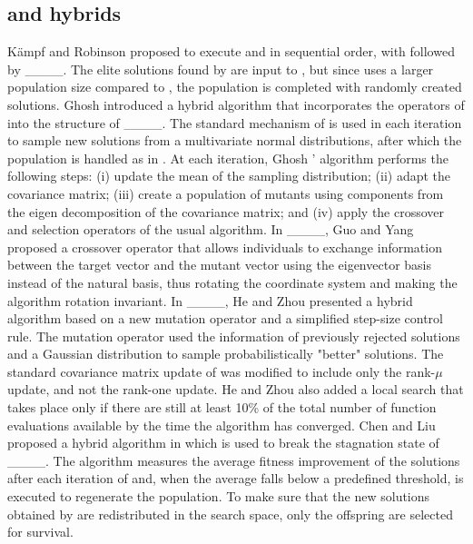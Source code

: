 \subsection{\CMAES and \DE hybrids}
Kämpf and Robinson proposed to execute \CMAES and \DE in sequential order, with \CMAES followed by \DE____.
The elite solutions found by \CMAES are input to \DE, but since \DE uses a larger population size compared to \CMAES, the \DE population is completed with randomly created solutions.
Ghosh \etal introduced a hybrid algorithm that incorporates the operators of \DE into the structure of \CMAES____.
The standard mechanism of \CMAES is used in each iteration to sample new solutions from a multivariate normal distributions, after which the population is handled as in \DE.
At each iteration, Ghosh \etal' algorithm performs the following steps: (i) update the mean of the sampling distribution; (ii) adapt the covariance matrix;
(iii) create a population of mutants using components from the eigen decomposition of the covariance matrix; and (iv) apply the crossover and selection operators of the usual \DE algorithm.
In ____, Guo and Yang proposed a crossover operator that allows individuals to exchange information between the target vector and the mutant vector using the eigenvector basis instead of the natural basis, thus rotating the coordinate system and making the algorithm rotation invariant.
In ____, He and Zhou presented a hybrid algorithm based on a new mutation operator and a simplified step-size control rule.
The mutation operator used the information of previously rejected solutions and a Gaussian distribution to sample probabilistically "better" solutions.
The standard covariance matrix update of \CMAES was modified to include only the rank-$\mu$ update, and not the rank-one update.
He and Zhou also added a local search that takes place only if there are still at least 10\% of the total number of function evaluations available by the time the algorithm has converged. 
Chen and Liu proposed a hybrid algorithm in which \DE is used to break the stagnation state of \CMAES____.
The algorithm measures the average fitness improvement of the solutions after each iteration of \CMAES and, when the average falls below a predefined threshold, \DE is executed to regenerate the population. 
To make sure that the new solutions obtained by \DE are redistributed in the search space, only the offspring are selected for survival.

